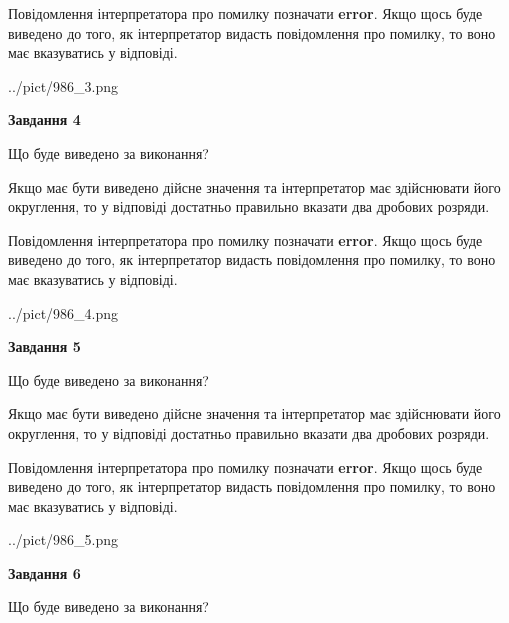 \documentclass[12pt, ukrainian]{article}
\begin{document}
{\begin {Large}
Повідомлення інтерпретатора про помилку позначати \textbf{error}.
Якщо щось буде виведено до того, як інтерпретатор видасть повідомлення про помилку, 
то воно має вказуватись у відповіді. \par

\begin{center}
	{../pict/986_3.png}
\end{center}
\newpage

{\begin {center}\textbf{Завдання 4}\end {center}}\par
Що буде виведено за виконання? \par

Якщо має бути виведено дійсне значення та інтерпретатор має здійснювати його округлення, 
то у відповіді достатньо правильно вказати два дробових розряди.

Повідомлення інтерпретатора про помилку позначати \textbf{error}.
Якщо щось буде виведено до того, як інтерпретатор видасть повідомлення про помилку, 
то воно має вказуватись у відповіді. \par

\begin{center}
	{../pict/986_4.png}
\end{center}
\newpage

{\begin {center}\textbf{Завдання 5}\end {center}}\par
Що буде виведено за виконання? \par

Якщо має бути виведено дійсне значення та інтерпретатор має здійснювати його округлення, 
то у відповіді достатньо правильно вказати два дробових розряди.

Повідомлення інтерпретатора про помилку позначати \textbf{error}.
Якщо щось буде виведено до того, як інтерпретатор видасть повідомлення про помилку, 
то воно має вказуватись у відповіді. \par

\begin{center}
	{../pict/986_5.png}
\end{center}
\newpage

{\begin {center}\textbf{Завдання 6}\end {center}}\par
Що буде виведено за виконання? \par


\end{Large}}
\end{document}
